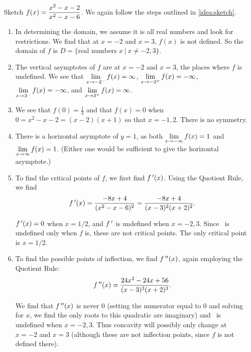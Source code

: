 \begin{example}\label{ex_sketch2}%
Sketch $\displaystyle f(x) = \frac{x^2-x-2}{x^2-x-6}$.
\solution
We again follow the steps outlined in \autoref{idea:sketch}.

\begin{enumerate}
	\item	In determining the domain, we assume it is all real numbers and look for restrictions. We find that at $x=-2$ and $x=3$, $f(x)$ is not defined. So the domain of $f$ is $D = \{\text{real numbers } x\ \vert \ x\neq -2,3\}$.
		
	\item	The vertical asymptotes of $f$ are at $x=-2$ and $x=3$, the places where $f$ is undefined.  We see that $\displaystyle\lim_{x\to-2^-}f(x)=\infty$, $\displaystyle\lim_{x\to-2^+}f(x)=-\infty$, $\displaystyle\lim_{x\to3^-}f(x)=-\infty$, and $\displaystyle\lim_{x\to3^+}f(x)=\infty$.
		
	\item	We see that $f(0)=\frac13$ and that $f(x)=0$ when $0=x^2-x-2=(x-2)(x+1)$ so that $x=-1,2$.  There is no symmetry.

	\item	There is a horizontal asymptote of $y=1$, as both $\displaystyle \lim_{x\to -\infty}f(x) = 1$ and $\displaystyle\lim_{x\to\infty}f(x) =1$.  (Either one would be sufficient to give the horizontal asymptote.)
		
	\item	To find the critical points of $f$, we first find $f\,'(x)$. Using the Quotient Rule, we find
	\[f\,'(x) = \frac{-8x+4}{(x^2-x-6)^2} = \frac{-8x+4}{(x-3)^2(x+2)^2}.\]
		
	$f\,'(x) = 0$ when $x = 1/2$, and $f\,'$ is undefined when $x=-2,3$. Since \fp\ is undefined only when $f$ is, these are not critical points. The only critical point is $x=1/2$.
		
	\item	To find the possible points of inflection, we find $f\,''(x)$, again employing the Quotient Rule:
	\[f\,''(x) = \frac{24x^2-24x+56}{(x-3)^3(x+2)^3}.\]

	We find that $f\,''(x)$ is never 0 (setting the numerator equal to 0 and solving for $x$, we find the only roots to this quadratic are imaginary) and \fpp\ is undefined when $x=-2,3$. Thus concavity will possibly only change at $x=-2$ and $x=3$ (although these are not inflection points, since $f$ is not defined there).
		

\end{enumerate}
\end{example}
